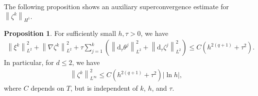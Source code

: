 \documentclass[11pt, reqno]{amsart}
\theoremstyle{definition}
\newtheorem{proposition}[theorem]{Proposition}
\numberwithin{equation}{section}
\newcommand{\dtt}{\mathrm{d}_\tau}
\newcommand{\norm}[2]{\left\|{#1}\right\|_{#2}}
\newcommand{\abs}[1]{\left|{#1}\right|}
\begin{document}
The following proposition shows an auxiliary superconvergence estimate for $\norm{\zeta^k}{H^1}$.

\begin{proposition}
For sufficiently small $h,\tau>0$, we have
\begin{align}\label{equ:error xi k L2}
    \norm{\xi^k}{L^2}^2
    +
    \norm{\nabla \zeta^k}{L^2}^2
    +
    \tau \sum_{j=1}^k \left(\norm{\dtt \theta^j}{L^2}^2 + \norm{\dtt \zeta^j}{L^2}^2 \right)
		\leq C(h^{2(q+1)}+ \tau^2).
\end{align}
In particular, for $d\leq 2$, we have
\begin{align}\label{equ:error zeta Linfty 2d}
    \norm{\zeta^k}{L^\infty}^2 \leq C(h^{2(q+1)}+ \tau^2) \abs{\ln h},
\end{align}
where $C$ depends on $T$, but is independent of $k$, $h$, and $\tau$.
\end{proposition}
\end{document}
